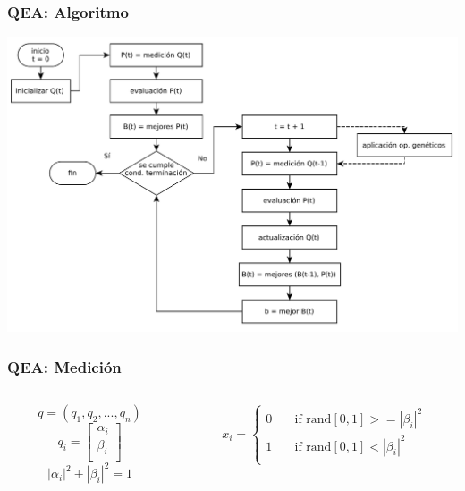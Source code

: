 \documentclass{beamer}
\begin{document}
\begin{frame}
\frametitle{QEA: Algoritmo}

\centering
\includegraphics[scale=0.55]{QEA_flowchart.pdf}

\end{frame}
\begin{frame}
\frametitle{QEA: Medición}

\centering
\begin{columns}[c]

\begin{column}{0.5\textwidth}
$$ 
q = (q_1, q_2, ..., q_n)
$$
$$
q_i = \begin{bmatrix}
			\alpha_i \\
			\beta_i \\
			\end{bmatrix} 
$$
$$ |\alpha_i|^2 + |\beta_i|^2 = 1 $$
\end{column}

\begin{column}{0.5\textwidth}
$$
x_i = 
  \begin{cases}
    0  & \quad \text{if rand}[0,1] >= |\beta_i|^2 \\
    1  & \quad \text{if rand}[0,1] < |\beta_i|^2 \\
  \end{cases}
$$
\end{column}
\end{columns}

\end{frame}
\end{document}
